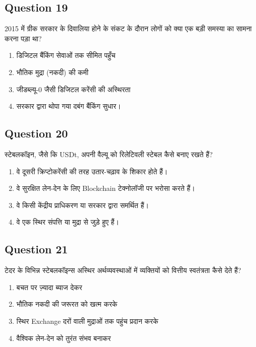 \documentclass[12pt,a4paper]{article}
\begin{document}
\bigskip


\subsection*{Question 19}
2015 में ग्रीक सरकार के दिवालिया होने के संकट के दौरान लोगों को क्या एक बड़ी समस्या का सामना करना पड़ा था?

\begin{enumerate}[label=\Alph*., leftmargin=*]
\item डिजिटल बैंकिंग सेवाओं तक सीमित पहुँच
\item भौतिक मुद्रा (नकदी) की कमी
\item जीडब्ल्यू-0 जैसी डिजिटल करेंसी की अस्थिरता
\item सरकार द्वारा थोपा गया दबंग बैंकिंग सुधार।
\end{enumerate}

\bigskip


\subsection*{Question 20}
स्टेबलकॉइन, जैसे कि USDt, अपनी वैल्यू को रिलेटिवली स्टेबल कैसे बनाए रखते हैं?

\begin{enumerate}[label=\Alph*., leftmargin=*]
\item वे दूसरी क्रिप्टोकरेंसी की तरह उतार-चढ़ाव के शिकार होते हैं।
\item वे सुरक्षित लेन-देन के लिए Blockchain टेक्नोलॉजी पर भरोसा करते हैं।
\item वे किसी केंद्रीय प्राधिकरण या सरकार द्वारा समर्थित हैं।
\item वे एक स्थिर संपत्ति या मुद्रा से जुड़े हुए हैं।
\end{enumerate}

\bigskip


\subsection*{Question 21}
टेदर के विभिन्न स्टेबलकॉइन्स अस्थिर अर्थव्यवस्थाओं में व्यक्तियों को वित्तीय स्वतंत्रता कैसे देते हैं?

\begin{enumerate}[label=\Alph*., leftmargin=*]
\item बचत पर ज़्यादा ब्याज देकर
\item भौतिक नकदी की जरूरत को खत्म करके
\item स्थिर Exchange दरों वाली मुद्राओं तक पहुंच प्रदान करके
\item वैश्विक लेन-देन को तुरंत संभव बनाकर
\end{enumerate}
\end{document}
